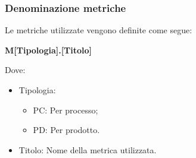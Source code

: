 \subsubsection{Denominazione metriche}

Le metriche utilizzate vengono definite come segue:

\begin{center}
    \large{\textbf{M[Tipologia].[Titolo]}}
\end{center}

Dove:
    \begin{itemize}
        \item Tipologia:
        \begin{itemize}
            \item PC: Per processo;
            \item PD: Per prodotto.
        \end{itemize}
        \item Titolo: Nome della metrica utilizzata.
    \end{itemize}

